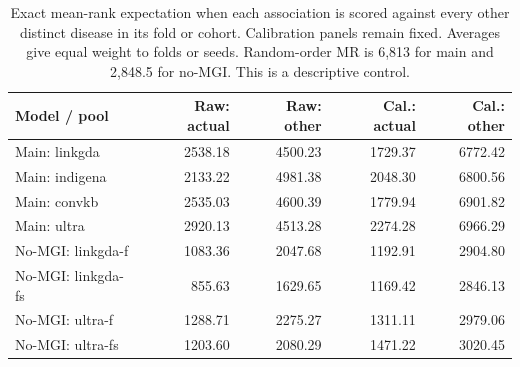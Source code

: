\begin{table}[tb]
\centering\small
\caption{Exact mean-rank expectation when each association is scored against every other distinct disease in its fold or cohort. Calibration panels remain fixed. Averages give equal weight to folds or seeds. Random-order MR is 6,813 for main and 2,848.5 for no-MGI. This is a descriptive control.}
\label{tab:query_control}
\begin{tabular}{lrrrr}
\toprule
Model / pool & Raw: actual & Raw: other & Cal.: actual & Cal.: other \\
\midrule
Main: linkgda & 2538.18 & 4500.23 & 1729.37 & 6772.42 \\
Main: indigena & 2133.22 & 4981.38 & 2048.30 & 6800.56 \\
Main: convkb & 2535.03 & 4600.39 & 1779.94 & 6901.82 \\
Main: ultra & 2920.13 & 4513.28 & 2274.28 & 6966.29 \\
No-MGI: linkgda-f & 1083.36 & 2047.68 & 1192.91 & 2904.80 \\
No-MGI: linkgda-fs & 855.63 & 1629.65 & 1169.42 & 2846.13 \\
No-MGI: ultra-f & 1288.71 & 2275.27 & 1311.11 & 2979.06 \\
No-MGI: ultra-fs & 1203.60 & 2080.29 & 1471.22 & 3020.45 \\
\bottomrule
\end{tabular}
\end{table}
